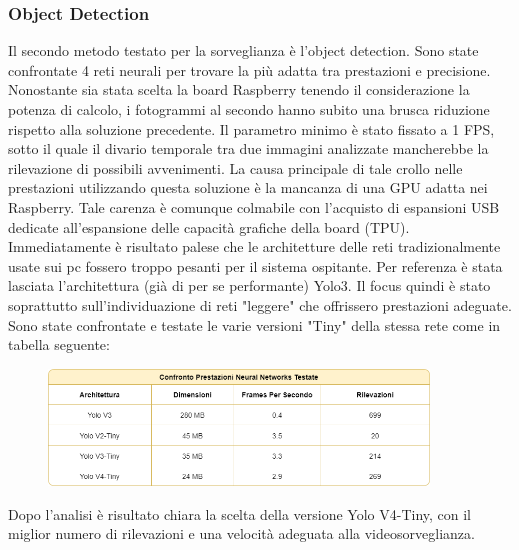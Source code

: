     \subsubsection{Object Detection}
    Il secondo metodo testato per la sorveglianza è l'object detection. Sono state confrontate 4 reti neurali per trovare la più adatta tra prestazioni e precisione. Nonostante sia stata scelta la board Raspberry tenendo il considerazione la potenza di calcolo, i fotogrammi al secondo hanno subito una brusca riduzione rispetto alla soluzione precedente. Il parametro minimo è stato fissato a 1 FPS, sotto il quale il divario temporale tra due immagini analizzate mancherebbe la rilevazione di possibili avvenimenti. La causa principale di tale crollo nelle prestazioni utilizzando questa soluzione è la mancanza di una GPU adatta nei Raspberry. Tale carenza è comunque colmabile con l'acquisto di espansioni USB dedicate all'espansione delle capacità grafiche della board (TPU).
    Immediatamente è risultato palese che le architetture delle reti tradizionalmente usate sui pc fossero troppo pesanti per il sistema ospitante. Per referenza è stata lasciata l'architettura (già di per se performante) Yolo3. Il focus quindi è stato soprattutto sull'individuazione di reti "leggere" che offrissero prestazioni adeguate. Sono state confrontate e testate le varie versioni "Tiny" della stessa rete come in tabella seguente:
        
    \begin{figure}[H]
        \centering
        \includegraphics[width=0.9\textwidth]{DrawIo/ConfrontoNeuralNetworks.png}
    \end{figure}
    
    Dopo l'analisi è risultato chiara la scelta della versione Yolo V4-Tiny, con il miglior numero di rilevazioni e una velocità adeguata alla videosorveglianza.
    
